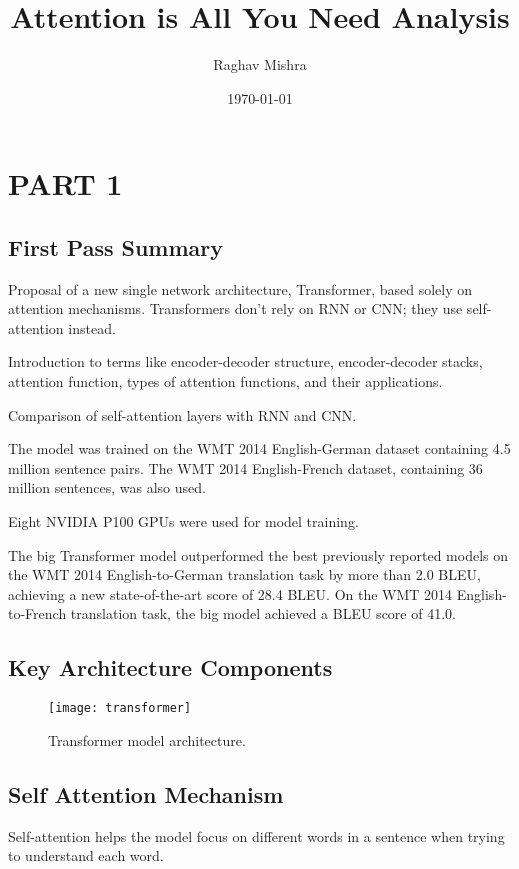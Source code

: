 \documentclass{article}
\title{Attention is All You Need Analysis}
\author{Raghav Mishra}
\date{\today}
\begin{document}
\maketitle

\section{PART 1}
\subsection{First Pass Summary}

Proposal of a new single network architecture, Transformer, based solely on attention mechanisms.  
Transformers don't rely on RNN or CNN; they use self-attention instead.

Introduction to terms like encoder-decoder structure, encoder-decoder stacks, attention function, types of attention functions, and their applications.

Comparison of self-attention layers with RNN and CNN.

The model was trained on the WMT 2014 English-German dataset containing 4.5 million sentence pairs.  
The WMT 2014 English-French dataset, containing 36 million sentences, was also used.

Eight NVIDIA P100 GPUs were used for model training.

The big Transformer model outperformed the best previously reported models on the WMT 2014 English-to-German translation task by more than 2.0 BLEU, achieving a new state-of-the-art score of 28.4 BLEU.  
On the WMT 2014 English-to-French translation task, the big model achieved a BLEU score of 41.0.

\subsection{Key Architecture Components}

\begin{figure}[ht]
    \centering
    \texttt{[image: transformer]} %
    \caption{Transformer model architecture.}
    \label{fig:transformer_arch}
\end{figure}

\subsection{Self Attention Mechanism}
Self-attention helps the model focus on different words in a sentence when trying to understand each word.
\end{document}
